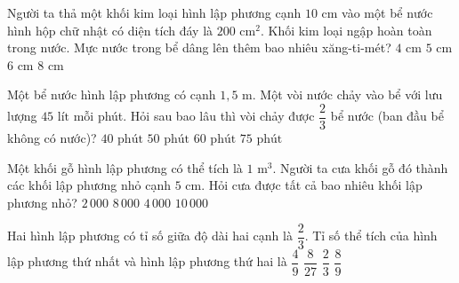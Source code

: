 \begin{ex} %
Người ta thả một khối kim loại hình lập phương cạnh $10\text{ cm}$ vào một bể nước hình hộp chữ nhật có diện tích đáy là $200\text{ cm}^2$. Khối kim loại ngập hoàn toàn trong nước. Mực nước trong bể dâng lên thêm bao nhiêu xăng-ti-mét?
\choice
{$4\text{ cm}$}
{\True $5\text{ cm}$}
{$6\text{ cm}$}
{$8\text{ cm}$}
\end{ex}

\begin{ex} %
Một bể nước hình lập phương có cạnh $1{,}5\text{ m}$. Một vòi nước chảy vào bể với lưu lượng $45\text{ lít}$ mỗi phút. Hỏi sau bao lâu thì vòi chảy được $\dfrac{2}{3}$ bể nước (ban đầu bể không có nước)?
\choice
{$40\text{ phút}$}
{\True $50\text{ phút}$}
{$60\text{ phút}$}
{$75\text{ phút}$}
\end{ex}

\begin{ex} %
Một khối gỗ hình lập phương có thể tích là $1\text{ m}^3$. Người ta cưa khối gỗ đó thành các khối lập phương nhỏ cạnh $5\text{ cm}$. Hỏi cưa được tất cả bao nhiêu khối lập phương nhỏ?
\choice
{$2\,000$}
{\True $8\,000$}
{$4\,000$}
{$10\,000$}
\end{ex}

\begin{ex} %
Hai hình lập phương có tỉ số giữa độ dài hai cạnh là $\dfrac{2}{3}$. Tỉ số thể tích của hình lập phương thứ nhất và hình lập phương thứ hai là
\choice
{$\dfrac{4}{9}$}
{\True $\dfrac{8}{27}$}
{$\dfrac{2}{3}$}
{$\dfrac{8}{9}$}
\end{ex}

